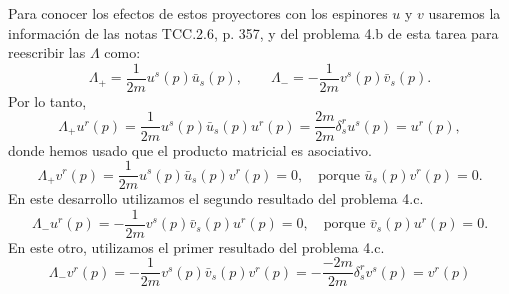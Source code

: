 \par Para conocer los efectos de estos proyectores con los espinores $u$ y $v$ usaremos la información de las notas TCC.2.6, p. 357, y del problema 4.b de esta tarea para reescribir las $\Lambda$ como:
\begin{equation}
\Lambda_+=\frac1{2m}u^s(p)\bar u_s(p),
\qquad
\Lambda_-=-\frac1{2m}v^s(p)\bar v_s(p).
\end{equation}
Por lo tanto,
\begin{equation}
\Lambda_+u^r(p)
=\frac1{2m}u^s(p)\bar u_s(p)u^r(p)
=\frac{2m}{2m}\delta^r_su^s(p)
=u^r(p),
\end{equation}
donde hemos usado que el producto matricial es asociativo.
\begin{equation}
\Lambda_+v^r(p)
=\frac1{2m}u^s(p)\bar u_s(p)v^r(p) = 0,
\quad
\text{porque $\bar u_s(p)v^r(p)=0$.}
\end{equation}
En este desarrollo utilizamos el segundo resultado del problema 4.c.
\begin{equation}
\Lambda_-u^r(p)
=-\frac1{2m}v^s(p)\bar v_s(p)u^r(p)
=0,
\quad
\text{porque $\bar v_s(p)u^r(p)=0$.}
\end{equation}
En este otro, utilizamos el primer resultado del problema 4.c.
\begin{equation}
\Lambda_-v^r(p)=-\frac1{2m}v^s(p)\bar v_s(p)v^r(p)
=-\frac{-2m}{2m}\delta_s^rv^s(p)
=v^r(p)
\end{equation}













